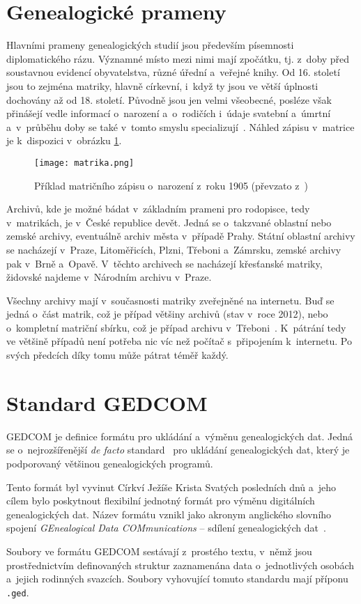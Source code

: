 	\section*{Genealogické prameny}
	Hlavními prameny genealogických studií jsou především písemnosti diplomatického rázu. Významné místo mezi nimi mají zpočátku, tj. z~doby před soustavnou evidencí obyvatelstva, různé úřední a~veřejné knihy. Od 16. století jsou to zejména matriky, hlavně církevní, i~když ty jsou ve větší úplnosti dochovány až od 18. století. Původně jsou jen velmi všeobecné, posléze však přinášejí vedle informací o~narození a~o~rodičích i~údaje svatební a~úmrtní a~v~průběhu doby se také v~tomto smyslu specializují~\cite{bib:GeneVade}. Náhled zápisu v~matrice je k~dispozici v~obrázku \ref{fig:matrica}.\par
	\begin{figure}[H]
		\centering
		\texttt{[image: matrika.png]}
		\caption{Příklad matričního zápisu o~narození z~roku 1905 (převzato z~\cite{bib:GeneActaPublica})}
		\label{fig:matrica}
	\end{figure}
	Archivů, kde je možné bádat v~základním prameni pro rodopisce, tedy v~matrikách, je v~České republice devět. Jedná se o~takzvané oblastní nebo zemské archivy, eventuálně archiv města v~případě Prahy. Státní oblastní archivy se nacházejí v~Praze, Litoměřicích, Plzni, Třeboni a~Zámrsku, zemské archivy pak v~Brně a~Opavě. V~těchto archivech se nacházejí křesťanské matriky, židovské najdeme v~Národním archivu v~Praze. \par
	Všechny archivy mají v~současnosti matriky zveřejněné na internetu. Buď se jedná o~část matrik, což je případ většiny archivů (stav v~roce 2012), nebo o~kompletní matriční sbírku, což je případ archivu v~Třeboni~\cite{bib:GeneLedni}. K~pátrání tedy ve většině případů není potřeba nic víc než počítač s~připojením k~internetu. Po svých předcích díky tomu může pátrat téměř každý. \par	



	\section{Standard GEDCOM}
	\label{sec:gedcom}
	GEDCOM je definice formátu pro ukládání a~výměnu genealogických dat. Jedná se o~nejrozšířenější \emph{de facto} standard~\cite{bib:GedcomGeniStd} pro ukládání genealogických dat, který je podporovaný většinou genealogických programů.\par
	Tento formát byl vyvinut Církví Ježíše Krista Svatých posledních dnů a~jeho cílem bylo poskytnout flexibilní jednotný formát pro výměnu digitálních genealogických dat. Název formátu vznikl jako akronym anglického slovního spojení \emph{GEnealogical Data COMmunications} -- sdílení genealogických dat~\cite{bib:Gedcom551Spec}.\par
	Soubory ve formátu GEDCOM sestávají z~prostého textu, v~němž jsou prostřednictvím definovaných struktur zaznamenána data o~jednotlivých osobách a~jejich rodinných svazcích. Soubory vyhovující tomuto standardu mají příponu \texttt{.ged}.

